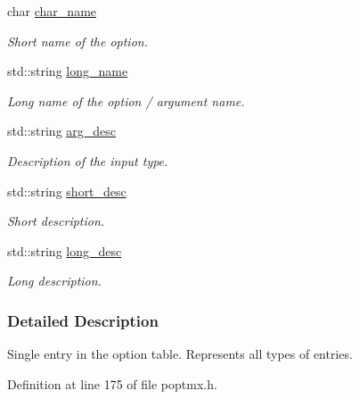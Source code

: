 \begin{DoxyCompactItemize}
char \hyperlink{classpoptmx_1_1Option_ae7e0ca795185ac4b4b20bc6766760a4a}{char\_\-name}
\begin{DoxyCompactList}\small\item\em Short name of the option. \item\end{DoxyCompactList}\item 
std::string \hyperlink{classpoptmx_1_1Option_ac9b28f10c43af2e3afc9684e0ef19cc6}{long\_\-name}
\begin{DoxyCompactList}\small\item\em Long name of the option / argument name. \item\end{DoxyCompactList}\item 
std::string \hyperlink{classpoptmx_1_1Option_a424688d1a39f40e5c4e13d98d1dd2e74}{arg\_\-desc}
\begin{DoxyCompactList}\small\item\em Description of the input type. \item\end{DoxyCompactList}\item 
std::string \hyperlink{classpoptmx_1_1Option_a16b86218d90bf80a07dc6a49aa8afece}{short\_\-desc}
\begin{DoxyCompactList}\small\item\em Short description. \item\end{DoxyCompactList}\item 
std::string \hyperlink{classpoptmx_1_1Option_a22d0ce433827d2ab6c427ff191fb1e51}{long\_\-desc}
\begin{DoxyCompactList}\small\item\em Long description. \item\end{DoxyCompactList}\end{DoxyCompactItemize}


\subsubsection{Detailed Description}
Single entry in the option table. Represents all types of entries. 

Definition at line 175 of file poptmx.h.



